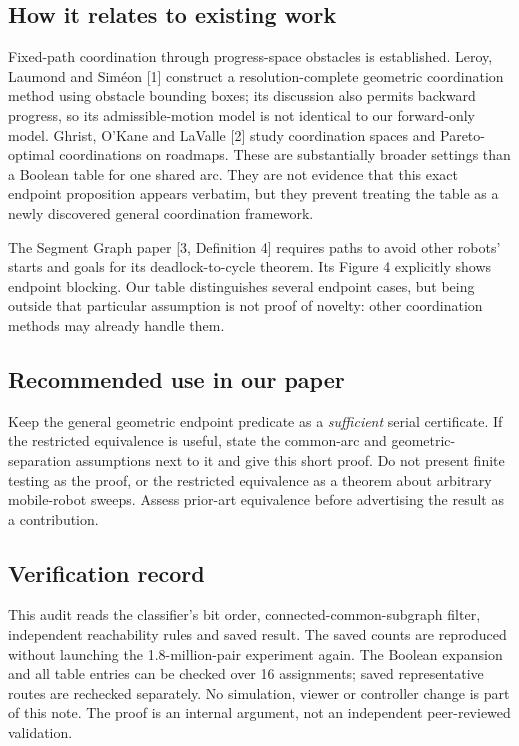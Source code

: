 \documentclass[11pt,a4paper]{article}
\begin{document}
\subsection*{How it relates to existing work}
Fixed-path coordination through progress-space obstacles is established.
Leroy, Laumond and Sim\'eon [1] construct a resolution-complete geometric
coordination method using obstacle bounding boxes; its discussion also permits
backward progress, so its admissible-motion model is not identical to our
forward-only model. Ghrist, O'Kane and LaValle
[2] study coordination spaces and Pareto-optimal coordinations on roadmaps.
These are substantially broader settings than a Boolean table for one shared
arc. They are not evidence that this exact endpoint proposition appears
verbatim, but they prevent treating the table as a newly discovered general
coordination framework.

The Segment Graph paper [3, Definition 4] requires paths to avoid other robots'
starts and goals for its deadlock-to-cycle theorem. Its Figure 4 explicitly
shows endpoint blocking. Our table distinguishes several endpoint cases, but
being outside that particular assumption is not proof of novelty: other
coordination methods may already handle them.

\subsection*{Recommended use in our paper}
Keep the general geometric endpoint predicate as a \emph{sufficient} serial
certificate. If the restricted equivalence is useful, state the common-arc and
geometric-separation assumptions next to it and give this short proof. Do not
present finite testing as the proof, or the restricted equivalence as a theorem
about arbitrary mobile-robot sweeps. Assess prior-art equivalence before
advertising the result as a contribution.

\subsection*{Verification record}
This audit reads the classifier's bit order, connected-common-subgraph filter,
independent reachability rules and saved result. The saved counts are reproduced
without launching the 1.8-million-pair experiment again. The Boolean expansion
and all table entries can be checked over 16 assignments; saved representative
routes are rechecked separately. No simulation, viewer or controller change is
part of this note. The proof is an internal argument, not an independent
peer-reviewed validation.
\end{document}
